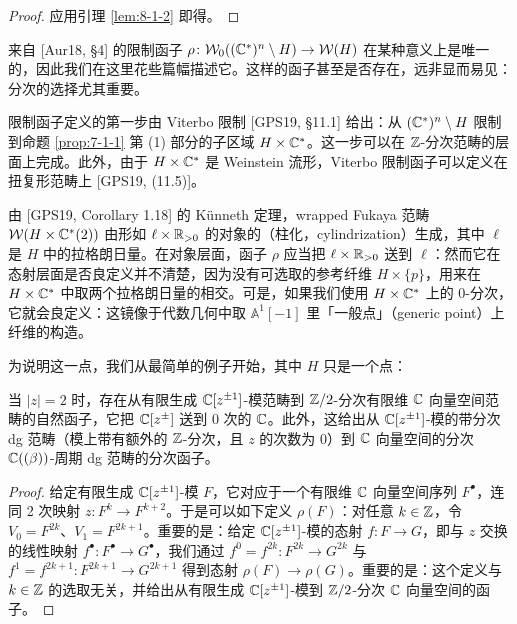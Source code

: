 
\begin{proof}
应用引理 \ref{lem:8-1-2} 即得。
\end{proof}

来自 [Aur18, §4] 的限制函子 $\rho\colon\mathcal{W}_0((\mathbb{C}^*)^n\setminus H)\to\mathcal{W}(H)$ 在某种意义上是唯一的，因此我们在这里花些篇幅描述它。这样的函子甚至是否存在，远非显而易见：分次的选择尤其重要。

限制函子定义的第一步由 Viterbo 限制 [GPS19, §11.1] 给出：从 $(\mathbb{C}^*)^n\setminus H$ 限制到命题 \ref{prop:7-1-1} 第 (1) 部分的子区域 $H\times\mathbb{C}^*$。这一步可以在 $\mathbb{Z}$-分次范畴的层面上完成。此外，由于 $H\times\mathbb{C}^*$ 是 Weinstein 流形，Viterbo 限制函子可以定义在扭复形范畴上 [GPS19, (11.5)]。

由 [GPS19, Corollary 1.18] 的 K{\"u}nneth 定理，wrapped Fukaya 范畴 $\mathcal{W}(H\times\mathbb{C}^*(2))$ 由形如 $\ell\times\mathbb{R}_{>0}$ 的对象的（柱化，cylindrization）生成，其中 $\ell$ 是 $H$ 中的拉格朗日量。在对象层面，函子 $\rho$ 应当把 $\ell\times\mathbb{R}_{>0}$ 送到 $\ell$：然而它在态射层面是否良定义并不清楚，因为没有可选取的参考纤维 $H\times\{p\}$，用来在 $H\times\mathbb{C}^*$ 中取两个拉格朗日量的相交。可是，如果我们使用 $H\times\mathbb{C}^*$ 上的 0-分次，它就会良定义：这镜像于代数几何中取 $\mathbb A^1[-1]$ 里「一般点」（generic point）上纤维的构造。


为说明这一点，我们从最简单的例子开始，其中 $H$ 只是一个点：

\begin{proposition}\label{prop:8-2-2}
当 $|z|=2$ 时，存在从有限生成 $\mathbb{C}[z^{\pm1}]$-模范畴到 $\mathbb{Z}/2$-分次有限维 $\mathbb{C}$ 向量空间范畴的自然函子，它把 $\mathbb{C}[z^{\pm}]$ 送到 0 次的 $\mathbb{C}$。此外，这给出从 $\mathbb{C}[z^{\pm1}]$-模的带分次 dg 范畴（模上带有额外的 $\mathbb{Z}$-分次，且 $z$ 的次数为 0）到 $\mathbb{C}$ 向量空间的分次 $\mathbb{C}((\beta))$-周期 dg 范畴的分次函子。
\end{proposition}


\begin{proof}
给定有限生成 $\mathbb{C}[z^{\pm1}]$-模 $F$，它对应于一个有限维 $\mathbb{C}$ 向量空间序列 $F^\bullet$，连同 2 次映射 $z\colon F^k\to F^{k+2}$。于是可以如下定义 $\rho(F)$：对任意 $k\in\mathbb{Z}$，令 $V_0=F^{2k}$、$V_1=F^{2k+1}$。重要的是：给定 $\mathbb{C}[z^{\pm1}]$-模的态射 $f\colon F\to G$，即与 $z$ 交换的线性映射 $f^\bullet\colon F^\bullet\to G^\bullet$，我们通过 $f^0=f^{2k}\colon F^{2k}\to G^{2k}$ 与 $f^1=f^{2k+1}\colon F^{2k+1}\to G^{2k+1}$ 得到态射 $\rho(F)\to\rho(G)$。重要的是：这个定义与 $k\in\mathbb{Z}$ 的选取无关，并给出从有限生成 $\mathbb{C}[z^{\pm1}]$-模到 $\mathbb{Z}/2$-分次 $\mathbb{C}$ 向量空间的函子。
\end{proof}

